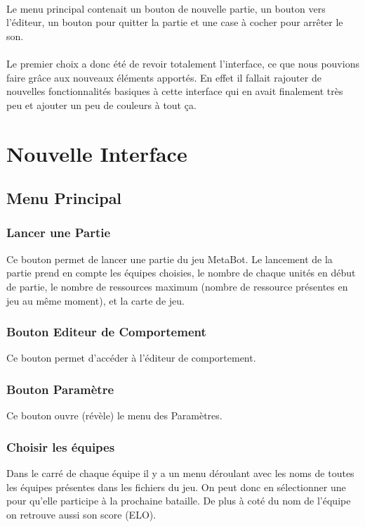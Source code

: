 \documentclass{report}
\begin{document}
\paragraph{}
Le menu principal contenait un bouton de nouvelle partie, un bouton vers l'éditeur, un bouton pour quitter la partie et une case à cocher pour arrêter le son.
\paragraph{}
\paragraph{}
Le premier choix a donc été de revoir totalement l'interface, ce que nous pouvions faire grâce aux nouveaux éléments apportés. En effet il fallait rajouter de nouvelles fonctionnalités basiques à cette interface qui en avait finalement très peu et ajouter un peu de couleurs à tout ça.
\section{Nouvelle Interface}

\subsection{Menu Principal}
\subsubsection{Lancer une Partie}
Ce bouton permet de lancer une partie du jeu MetaBot. Le lancement de la partie prend en compte les équipes choisies, le nombre de chaque unités en début de partie, le nombre de ressources maximum (nombre de ressource présentes en jeu au même moment), et la carte de jeu.
\subsubsection{Bouton Editeur de Comportement}
Ce bouton permet d'accéder à l'éditeur de comportement.
\subsubsection{Bouton Paramètre}
Ce bouton ouvre (révèle) le menu des Paramètres.
\subsubsection{Choisir les équipes}
Dans le carré de chaque équipe il y a un menu déroulant avec les noms de toutes les équipes présentes dans les fichiers du jeu. On peut donc en sélectionner une pour qu'elle participe à la prochaine bataille.
De plus à coté du nom de l'équipe on retrouve aussi son score (ELO).
\end{document}
